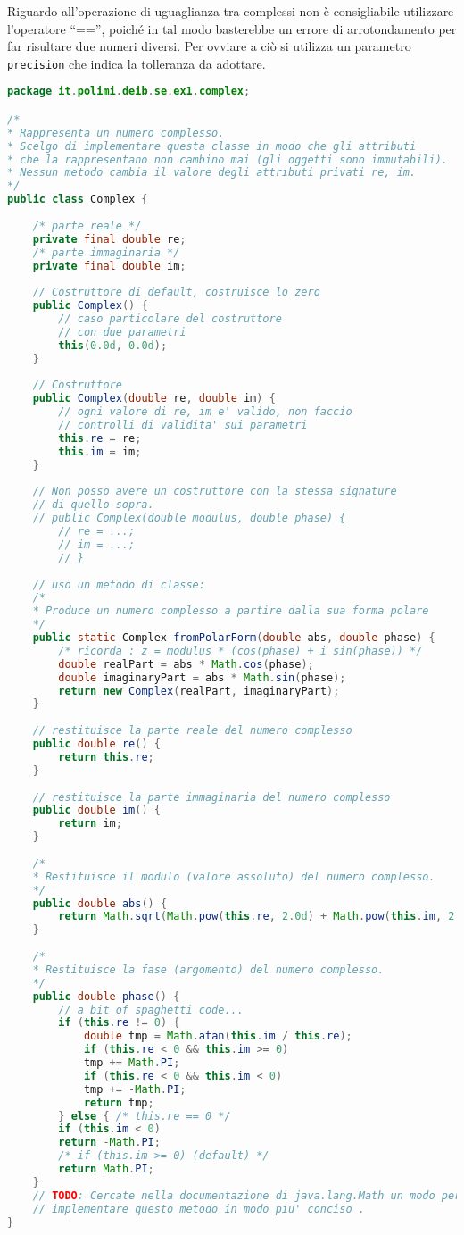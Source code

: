 \documentclass{article}
\begin{document}
Riguardo all'operazione di uguaglianza tra complessi non è consigliabile
utilizzare l'operatore ``=='', poiché in tal modo basterebbe un errore
di arrotondamento per far risultare due numeri diversi.
Per ovviare a ciò si utilizza un parametro \texttt{precision} che indica la tolleranza da
adottare.


\begin{lstlisting}[language=Java,escapechar=|]
package it.polimi.deib.se.ex1.complex;

/*
* Rappresenta un numero complesso.
* Scelgo di implementare questa classe in modo che gli attributi
* che la rappresentano non cambino mai (gli oggetti sono immutabili).
* Nessun metodo cambia il valore degli attributi privati re, im.
*/
public class Complex {
	
	/* parte reale */
	private final double re;
	/* parte immaginaria */
	private final double im;
	
	// Costruttore di default, costruisce lo zero
	public Complex() {
		// caso particolare del costruttore
		// con due parametri
		this(0.0d, 0.0d);
	}
	
	// Costruttore
	public Complex(double re, double im) {
		// ogni valore di re, im e' valido, non faccio
		// controlli di validita' sui parametri
		this.re = re;
		this.im = im;
	}
	
	// Non posso avere un costruttore con la stessa signature
	// di quello sopra.
	// public Complex(double modulus, double phase) {
		// re = ...;
		// im = ...;
		// }
	
	// uso un metodo di classe:
	/*
	* Produce un numero complesso a partire dalla sua forma polare
	*/
	public static Complex fromPolarForm(double abs, double phase) {
		/* ricorda : z = modulus * (cos(phase) + i sin(phase)) */
		double realPart = abs * Math.cos(phase);
		double imaginaryPart = abs * Math.sin(phase);
		return new Complex(realPart, imaginaryPart);
	}
	
	// restituisce la parte reale del numero complesso
	public double re() {
		return this.re;
	}
	
	// restituisce la parte immaginaria del numero complesso
	public double im() {
		return im;
	}
	
	/*
	* Restituisce il modulo (valore assoluto) del numero complesso.
	*/
	public double abs() {
		return Math.sqrt(Math.pow(this.re, 2.0d) + Math.pow(this.im, 2.0d));
	}
	
	/*
	* Restituisce la fase (argomento) del numero complesso.
	*/
	public double phase() {
		// a bit of spaghetti code...
		if (this.re != 0) {
			double tmp = Math.atan(this.im / this.re);
			if (this.re < 0 && this.im >= 0)
			tmp += Math.PI;
			if (this.re < 0 && this.im < 0)
			tmp += -Math.PI;
			return tmp;
		} else { /* this.re == 0 */
		if (this.im < 0)
		return -Math.PI;
		/* if (this.im >= 0) (default) */
		return Math.PI;
	}
	// TODO: Cercate nella documentazione di java.lang.Math un modo per
	// implementare questo metodo in modo piu' conciso .
}


\end{lstlisting}
\end{document}
